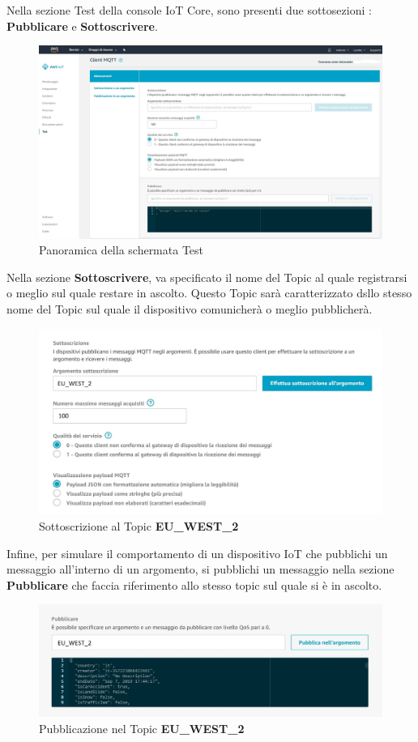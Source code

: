 Nella sezione Test della console IoT Core, sono presenti due sottosezioni : \textbf{Pubblicare}  e \textbf{Sottoscrivere}.
\begin{figure}
	\begin{center}
		\includegraphics[width=1\columnwidth]{images/_3}
	\end{center}
	\caption{Panoramica della schermata Test}
	\label{fig:_3}
\end{figure}
Nella sezione \textbf{Sottoscrivere}, va specificato il nome del Topic al quale registrarsi o meglio sul quale restare in ascolto. Questo Topic sarà caratterizzato dsllo stesso nome del Topic sul quale il dispositivo comunicherà o meglio pubblicherà.
\begin{figure}
	\begin{center}
		\includegraphics[width=0.8\columnwidth]{images/_4}
	\end{center}
	\caption{Sottoscrizione al Topic \textbf{EU\_WEST\_2}}
	\label{fig:_4}
\end{figure}
Infine, per simulare il comportamento di un dispositivo IoT che pubblichi un messaggio all'interno di un argomento, si pubblichi un messaggio nella sezione \textbf{Pubblicare} che faccia riferimento allo stesso topic sul quale si è in ascolto.
\begin{figure}
	\begin{center}
		\includegraphics[width=1\columnwidth]{images/_5}
	\end{center}
	\caption{Pubblicazione nel Topic \textbf{EU\_WEST\_2}}
	\label{fig:_5}
\end{figure}

